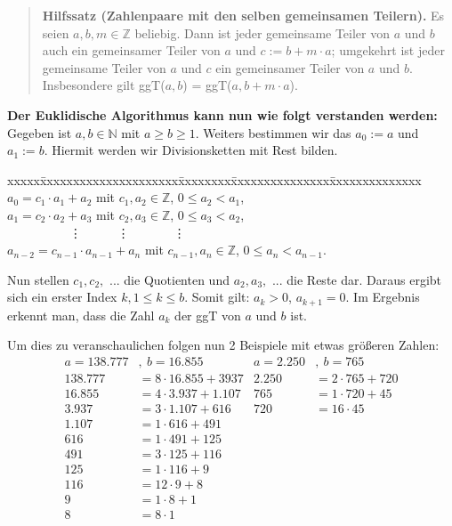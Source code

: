 \documentclass[german,12pt,a4paper]{article}
\begin{document}
\begin{quote}
\small
\textbf{Hilfssatz (Zahlenpaare mit den selben gemeinsamen Teilern).} Es seien $a, b, m \in \mathbb{Z}$ beliebig. Dann ist jeder gemeinsame Teiler von $a$ und $b$ auch ein gemeinsamer Teiler von $a$ und $c := b + m \cdot a$; umgekehrt ist jeder gemeinsame Teiler von $a$ und $c$ ein gemeinsamer Teiler von $a$ und $b$. Insbesondere gilt ggT($a, b$) = ggT($a, b + m \cdot a$).\newline
\autocite[17]{RempeGillen2009}\newpage
\end{quote}
\textbf{Der Euklidische Algorithmus kann nun wie folgt verstanden werden:}\newline
Gegeben ist $a, b \in \mathbb{N}$ mit $a \ge b \ge 1$. Weiters bestimmen wir das $a_0 := a$ und $a_1 := b$. Hiermit werden wir Divisionsketten mit Rest bilden.
\begin{tabbing}
xxxxx\=xxxxxxxxxxxxxxxxxxxxx\=xxxxxxxx\=xxxxxxxxxxxxxxx\=xxxxxxxxxxxxxx\kill
\> $a_0 = c_1 \cdot a_1 + a_2$             \> mit \> $c_1, a_2 \in \mathbb{Z}$,     \> $0 \le a_2 < a_1$,  \\
\> $a_1 = c_2 \cdot a_2 + a_3$             \> mit \> $c_2, a_3 \in \mathbb{Z}$,     \> $0 \le a_3 < a_2$,  \\
\> \ \ \ \ \ \ \ \ \ \ \vdots              \>     \>\ \ \ \ \ \vdots                \>\ \ \ \ \ \ \ \vdots \\
\> $a_{n-2} = c_{n-1} \cdot a_{n-1} + a_n$ \> mit \> $c_{n-1}, a_n \in \mathbb{Z}$, \> $0 \le a_n < a_{n-1}$.
\end{tabbing}
Nun stellen $c_1, c_2,$ ... die Quotienten und $a_2, a_3,$ ... die Reste dar. Daraus ergibt sich ein erster Index $k, 1 \le k \le b$. Somit gilt: $a_k > 0$, $a_{k+1} = 0$.\newline
Im Ergebnis erkennt man, dass die Zahl $a_k$ der ggT von $a$ und $b$ ist.

Um dies zu veranschaulichen folgen nun 2 Beispiele mit etwas größeren Zahlen:
\begin{align}
a = 138.777 &,\ b = 16.855        & a = 2.250 &,\ b = 765 \\
138.777 &= 8 \cdot 16.855 + 3937 & 2.250 &= 2 \cdot 765 + 720 \\
16.855  &= 4 \cdot 3.937 + 1.107 & 765   &= 1 \cdot 720 + 45 \\
3.937   &= 3 \cdot 1.107 + 616   & 720   &= 16 \cdot 45 \\
1.107   &= 1 \cdot 616 + 491     &  \\
616     &= 1 \cdot 491 + 125     &  \\
491     &= 3 \cdot 125 + 116     &  \\
125     &= 1 \cdot 116 + 9       &  \\
116     &= 12 \cdot 9 + 8        &  \\
9       &= 1 \cdot 8 + 1         &  \\
8       &= 8 \cdot 1
\end{align}
\end{document}
